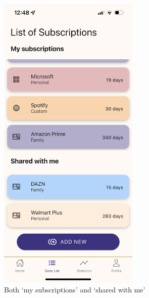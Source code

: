 \documentclass[11pt]{article}
\begin{document}
\begin{figure}[h!]
    \centering
    \begin{minipage}[c]{0.45\textwidth}
        \centering
        \includegraphics[width=0.6\textwidth, clip]{../../assets/smartphone/subsList2.PNG}
        \caption{Both `my subscriptions' and `shared with me'}
        \label{fig:subsList2}
    \end{minipage}\hspace{1cm}%
    \begin{minipage}[c]{0.45\textwidth}
        \centering

\end{minipage}
\end{figure}
\end{document}
